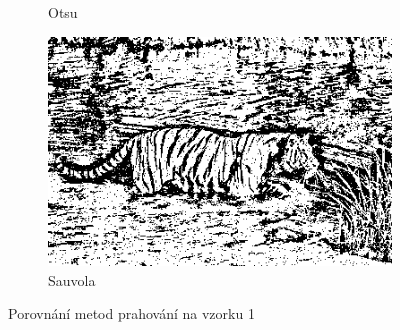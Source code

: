 \documentclass[12pt,a4paper]{article}
\begin{document}
\begin{figure}[h!]
\begin{subfigure}[b]{0.3\textwidth}
        \caption{Otsu}
    \end{subfigure}
    \hfill
    \begin{subfigure}[b]{0.3\textwidth}
        \includegraphics[width=\textwidth]{sauvola1.png}
        \caption{Sauvola}
    \end{subfigure}
    \caption{Porovnání metod prahování na vzorku 1}
\end{figure}

\vspace{0.5cm}
\end{document}
